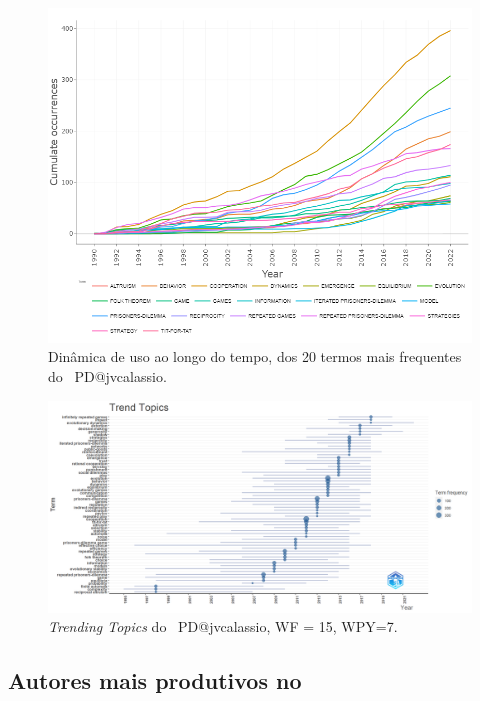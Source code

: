 \begin{figure}
    \centering
    \includegraphics[width=1\textwidth]{exploratory-data-analysis/jvcalassio/PesqBibliogr/PrisonersDilemma/WoS-20221201/Dataset/WordDynamics-2022-12-03.png}
    \caption{Dinâmica de uso ao longo do tempo, dos 20 termos mais frequentes do \dataset\ PD@jvcalassio.}
    \label{fig:PD@jvcalassio:WordDynamics}
\end{figure}

\begin{figure}
    \centering
    \includegraphics[width=1\textwidth]{exploratory-data-analysis/jvcalassio/PesqBibliogr/PrisonersDilemma/WoS-20221201/Dataset/TrendTopics-2022-12-03.png}
    \caption{\textit{Trending Topics} do \dataset\ PD@jvcalassio, WF = 15, WPY=7.}
    \label{fig:PD@jvcalassio:TrendTopics}
\end{figure}

\subsection{Autores mais produtivos no \dataset}

